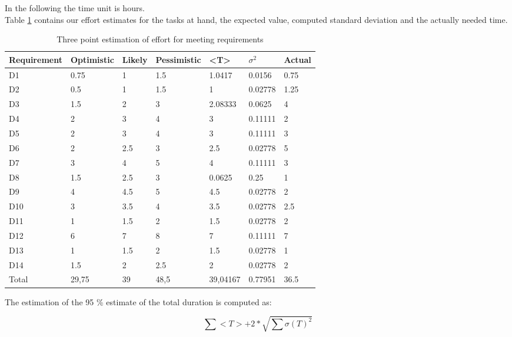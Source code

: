 In the following the time unit is hours.\\
Table \ref{tbl:D1_effort_estimation} contains our effort estimates for the tasks at hand, the expected value, computed standard deviation and the actually needed time.
\begin{table}[H]
\centering
\caption{Three point estimation of effort for meeting requirements}
\begin{adjustbox}{width=1\textwidth, center=\textwidth}
\renewcommand{\arraystretch}{1}
\begin{tabular}{lllllll}
\textbf{Requirement} & \textbf{Optimistic} & \textbf{Likely} & \textbf{Pessimistic} & \textbf{<T>} & \textbf{$\sigma^2$} & \textbf{Actual}\\\hline
	D1 & 0.75 & 1 & 1.5 & 1.0417 & 0.0156 & 0.75 \\
	D2 & 0.5 & 1 & 1.5 & 1 & 0.02778 & 1.25 \\
	D3 & 1.5 & 2 & 3 & 2.08333 & 0.0625 & 4 \\
	D4 & 2 & 3 & 4 & 3 & 0.11111 & 2 \\
	D5 & 2 & 3 & 4 & 3 & 0.11111 & 3 \\
	D6 & 2 & 2.5 & 3 & 2.5 & 0.02778 & 5 \\
	D7 & 3 & 4 & 5 & 4 & 0.11111 & 3 \\
	D8 & 1.5 & 2.5 & 3 & 0.0625 & 0.25 & 1 \\
	D9 & 4 & 4.5 & 5 & 4.5 & 0.02778& 2 \\
	D10 & 3 & 3.5 & 4 & 3.5 & 0.02778 & 2.5 \\
	D11 & 1 & 1.5 & 2 & 1.5 & 0.02778 & 2 \\
	D12 & 6 & 7 & 8 & 7 & 0.11111 & 7 \\
	D13 & 1 & 1.5 & 2 & 1.5 & 0.02778 & 1 \\
	D14 & 1.5 & 2 & 2.5 & 2 & 0.02778 & 2 \\\hline
	Total & 29,75 & 39 & 48,5 & 39,04167 & 0.77951 & 36.5
\end{tabular}
\end{adjustbox}
\label{tbl:D1_effort_estimation}
\end{table}

The estimation of the 95 \% estimate of the total duration is computed as:

\begin{equation}
	\sum <T> + 2*\sqrt{\sum \sigma(T)^2}
\end{equation}

